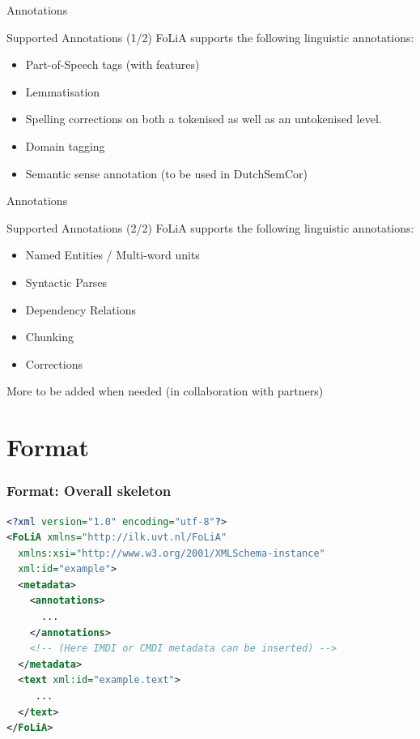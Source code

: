 \documentclass[compress]{beamer}
\begin{document}
\begin{frame}{Annotations}
    \begin{block}{Supported Annotations (1/2)}
        FoLiA supports the following linguistic annotations:
        \begin{itemize}
            \item Part-of-Speech tags (with features)
            \item Lemmatisation
            \item Spelling corrections on both a tokenised as well as an untokenised level.
            \item Domain tagging
            \item Semantic sense annotation (to be used in DutchSemCor)
        \end{itemize}
        

    \end{block}
\end{frame}
            
\begin{frame}{Annotations}
    \begin{block}{Supported Annotations (2/2)}
        FoLiA supports the following linguistic annotations:
        \begin{itemize}            
            \item Named Entities / Multi-word units
            \item Syntactic Parses
            \item Dependency Relations
            \item Chunking
            \item Corrections
        \end{itemize}
    
        More to be added when needed (in collaboration with partners)

    \end{block}
\end{frame}

\section{Format}

\begin{frame}[fragile]
\frametitle{Format: Overall skeleton}
\begin{lstlisting}[language=xml]
<?xml version="1.0" encoding="utf-8"?>
<FoLiA xmlns="http://ilk.uvt.nl/FoLiA"
  xmlns:xsi="http://www.w3.org/2001/XMLSchema-instance"
  xml:id="example">
  <metadata>    
    <annotations>
      ...
    </annotations>    
    <!-- (Here IMDI or CMDI metadata can be inserted) -->
  </metadata>
  <text xml:id="example.text">
     ...
  </text>
</FoLiA>  
\end{lstlisting}
\end{frame}
\end{document}
